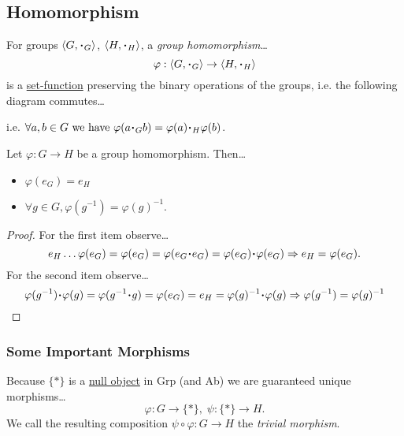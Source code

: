 \subsection{Homomorphism}\label{grouphomomorphism}

For groups $\langle G, \LargerCdot_G \rangle$, $\langle H, \LargerCdot_H \rangle$, a \emph{group homomorphism}\dots
$$\varphi : \langle G, \LargerCdot_G \rangle \rightarrow \langle H, \LargerCdot_H \rangle$$
is a \hyperref[function]{set-function} preserving the binary operations of the groups, i.e. the following diagram commutes\dots

\begin{figure}[H]
\centering

\end{figure}

\noindent i.e. $\forall a,b \in G \textrm{ we have } \varphi(a \LargerCdot_G b) = \varphi(a) \LargerCdot_H \varphi(b)$.

\begin{proposition}
Let $\varphi : G \rightarrow H$ be a group homomorphism. Then\dots
\begin{itemize}
  \item $\varphi(e_G) = e_H$
  \item $\forall g \in G, \varphi (g^{-1}) = \varphi(g)^{-1}$.
\end{itemize}
\end{proposition}

\begin{proof}
For the first item observe\dots
$$e_H \dots \varphi(e_G) = \varphi(e_G) = \varphi(e_G \LargerCdot e_G) = \varphi(e_G) \LargerCdot \varphi(e_G) \Rightarrow e_H = \varphi(e_G).$$
For the second item observe\dots
$$\varphi (g^{-1}) \LargerCdot \varphi (g) = \varphi (g^{-1} \LargerCdot g) = \varphi (e_G) = e_H = \varphi (g)^{-1} \LargerCdot \varphi (g) \Rightarrow \varphi (g^{-1}) = \varphi (g)^{-1}$$
\end{proof}

\subsubsection{Some Important Morphisms}

\label{trivialmorphism}
Because $\{ * \}$ is a \hyperref[null]{null object} in Grp (and Ab) we are guaranteed unique morphisms\dots
$$\varphi : G \rightarrow \{ * \}, \; \psi : \{ * \} \rightarrow H.$$
We call the resulting composition $\psi \circ \varphi : G \rightarrow H$ the \emph{trivial morphism}.

